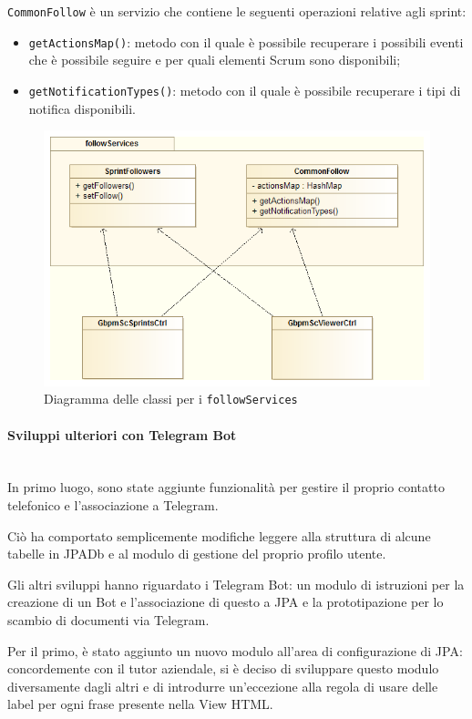 \texttt{CommonFollow} è un servizio che contiene le seguenti operazioni
relative agli sprint:

\begin{itemize}
\item \texttt{getActionsMap()}: metodo con il quale è possibile recuperare i
  possibili eventi che è possibile seguire e per quali elementi Scrum sono
  disponibili;
\item \texttt{getNotificationTypes()}: metodo con il quale è possibile
  recuperare i tipi di notifica disponibili.
\end{itemize}

\begin{figure}%
\centering
\includegraphics[width=.8\columnwidth]{immagini/followServices}
\caption{Diagramma delle classi per i \texttt{followServices}}
\label{fig:notif-frontend-cd}%
\end{figure}

\paragraph{Sviluppi ulteriori con Telegram Bot} \mbox{} \\

In primo luogo, sono state aggiunte funzionalità per gestire il proprio
contatto telefonico e l'associazione a Telegram.

Ciò ha comportato semplicemente modifiche leggere alla struttura di alcune
tabelle in JPADb e al modulo di gestione del proprio profilo utente.

Gli altri sviluppi hanno riguardato i Telegram Bot: un modulo di istruzioni per
la creazione di un Bot e l'associazione di questo a JPA e la prototipazione
per lo scambio di documenti via Telegram.

Per il primo, è stato aggiunto un nuovo modulo all'area di configurazione di
JPA: concordemente con il tutor aziendale, si è deciso di sviluppare questo
modulo diversamente dagli altri e di introdurre un'eccezione alla regola di
usare delle label per ogni frase presente nella View HTML.

